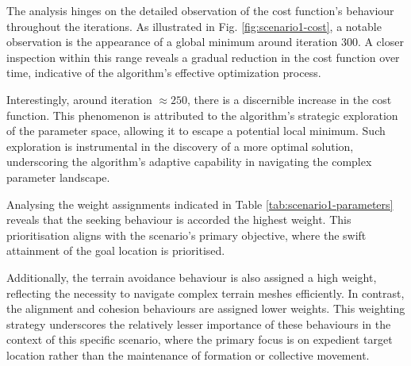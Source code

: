 \documentclass[12pt]{article}
\begin{document}
The analysis hinges on the detailed observation of the cost function's behaviour throughout the iterations. As illustrated in Fig. \ref{fig:scenario1-cost}, a notable observation is the appearance of a global minimum around iteration 300. A closer inspection within this range reveals a gradual reduction in the cost function over time, indicative of the algorithm's effective optimization process. 

Interestingly, around iteration $\approx 250$, there is a discernible increase in the cost function. This phenomenon is attributed to the algorithm's strategic exploration of the parameter space, allowing it to escape a potential local minimum. Such exploration is instrumental in the discovery of a more optimal solution, underscoring the algorithm's adaptive capability in navigating the complex parameter landscape.

Analysing the weight assignments indicated in Table \ref{tab:scenario1-parameters} reveals that the seeking behaviour is accorded the highest weight. This prioritisation aligns with the scenario's primary objective, where the swift attainment of the goal location is prioritised. 

Additionally, the terrain avoidance behaviour is also assigned a high weight, reflecting the necessity to navigate complex terrain meshes efficiently. In contrast, the alignment and cohesion behaviours are assigned lower weights. This weighting strategy underscores the relatively lesser importance of these behaviours in the context of this specific scenario, where the primary focus is on expedient target location rather than the maintenance of formation or collective movement. 
\end{document}
